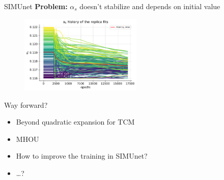 \documentclass[aspectratio=169, 8pt,t]{beamer}
\begin{document}
\begin{frame}{SIMUnet}
  \textbf{Problem:} $\alpha_s$ doesn't stabilize and depends on initial value
  \begin{figure}
    \includegraphics[width=0.52\textwidth]{figures/alphasovertime.pdf}
  \end{figure}

\end{frame}


\begin{frame}{Way forward?}
  \begin{itemize}
    \item Beyond quadratic expansion for TCM
    \item MHOU
    \item How to improve the training in SIMUnet?
    \item \ldots ?
  \end{itemize}
\end{frame}
\end{document}
